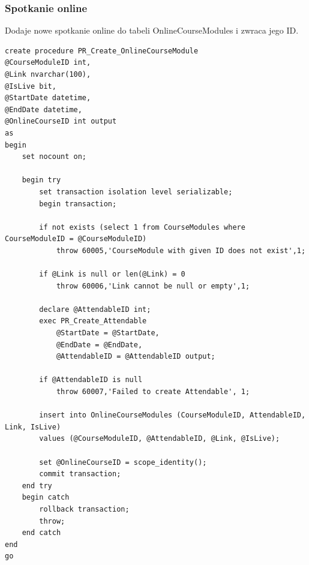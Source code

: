 \documentclass[11pt,a4paper]{article}
\begin{document}
\subsubsection{Spotkanie online}
Dodaje nowe spotkanie online do tabeli OnlineCourseModules i zwraca jego ID.
\begin{Verbatim}[breaklines=true]
create procedure PR_Create_OnlineCourseModule
@CourseModuleID int,
@Link nvarchar(100),
@IsLive bit,
@StartDate datetime,
@EndDate datetime,
@OnlineCourseID int output
as
begin
    set nocount on;

    begin try
        set transaction isolation level serializable;
        begin transaction;

        if not exists (select 1 from CourseModules where CourseModuleID = @CourseModuleID)
            throw 60005,'CourseModule with given ID does not exist',1;

        if @Link is null or len(@Link) = 0
            throw 60006,'Link cannot be null or empty',1;

        declare @AttendableID int;
        exec PR_Create_Attendable
            @StartDate = @StartDate,
            @EndDate = @EndDate,
            @AttendableID = @AttendableID output;

        if @AttendableID is null
            throw 60007,'Failed to create Attendable', 1;

        insert into OnlineCourseModules (CourseModuleID, AttendableID, Link, IsLive)
        values (@CourseModuleID, @AttendableID, @Link, @IsLive);

        set @OnlineCourseID = scope_identity();
        commit transaction;
    end try
    begin catch
        rollback transaction;
        throw;
    end catch
end
go
\end{Verbatim}
\end{document}
